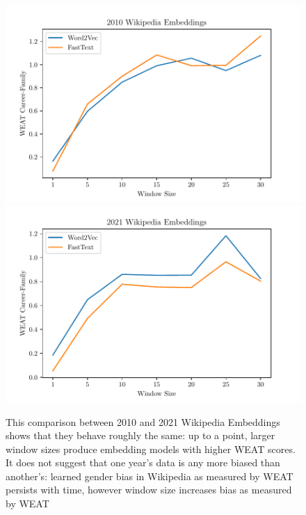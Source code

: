 \documentclass[11pt,a4paper]{article}
\begin{document}
\begin{figure}
  \includegraphics[width=.5\textwidth]{figures/car-fam_x_window_size_2010.pdf}
  \includegraphics[width=.5\textwidth]{figures/car-fam_x_window_size_2021.pdf}
  \caption{This comparison between 2010 and 2021 Wikipedia Embeddings shows that
    they behave roughly the same: up to a point, larger window sizes produce
    embedding models with higher WEAT scores. It does not suggest that one year's
    data is any more biased than another's: learned gender bias in Wikipedia as
    measured by WEAT persists with time, however window size increases bias as measured by WEAT\label{weatxwindow}}
\end{figure}
\end{document}
